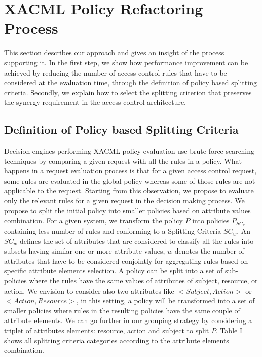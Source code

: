\section{XACML Policy Refactoring Process} \label{sec:approach}
This section describes our approach and gives an insight of the process supporting it. In the first step, we show how performance improvement can be achieved by
reducing the number of access control rules that have to be considered at the evaluation time, through the definition of policy based splitting criteria. 
Secondly, we explain how to select the splitting criterion that preserves the synergy requirement in the access control architecture.
\subsection{Definition of Policy based Splitting Criteria}
Decision engines performing XACML policy evaluation use brute force searching techniques by comparing a given request with all the rules in a policy.
What happens in a request evaluation process is that for a given access control request, some rules are evaluated in the global policy whereas some of those rules are not
 applicable to the request. Starting from this observation, we propose to evaluate only the relevant rules for a given request in the decision making process. 
We propose to split the initial policy into smaller policies based on attribute values combination. For a given system, we transform the policy \normalsize $P$ into 
policies \normalsize $P_{SC_{w}}$ containing less number of rules and conforming to a Splitting Criteria $SC_{w}$. An $SC_{w}$ defines the set of attributes that are considered 
to classify all the rules into subsets having similar one or more attribute values, $w$ denotes the number of attributes that have to be considered conjointly for aggregating 
rules based on specific attribute elements selection. A policy can be split into a set of sub-policies where the rules have the same values of attributes of subject, resource, or 
action. We envision to consider also two attributes like $<Subject, Action>$ or $<Action, Resource>$, in this setting, a policy will be transformed into a set of smaller 
policies where rules in the resulting policies have the same couple of attribute elements. We can go further in our grouping strategy by considering a triplet of attributes
elements: resource, action and subject to split \normalsize $P$. Table I shows all splitting criteria categories according to the attribute elements combination.
